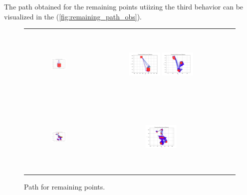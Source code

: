 The path obtained for the remaining points utiizing the third behavior can be visualized in the (\autoref{fig:remaining_path_obs}). 

\begin{figure}[H]
    \centering
    \begin{tabular}{ccc} 
         \includegraphics[height=36mm,width=0.24\textwidth]{Images/simulation_obs/left_points_covered_obs/1.png}
        & \includegraphics[height=36mm,width=0.24\textwidth]{Images/simulation_obs/left_points_covered_obs/2.png}
         \includegraphics[height=36mm,width=0.24\textwidth]{Images/simulation_obs/left_points_covered_obs/3.png}\\[-4pt]

        \includegraphics[height=36mm,width=0.24\textwidth]{Images/simulation_obs/left_points_covered_obs/4.png}
        & \includegraphics[height=36mm,width=0.24\textwidth]{Images/simulation_obs/left_points_covered_obs/5.png} 

    \end{tabular}
    \caption{Path for remaining points.\label{fig:remaining_path_obs}} 
\end{figure}


